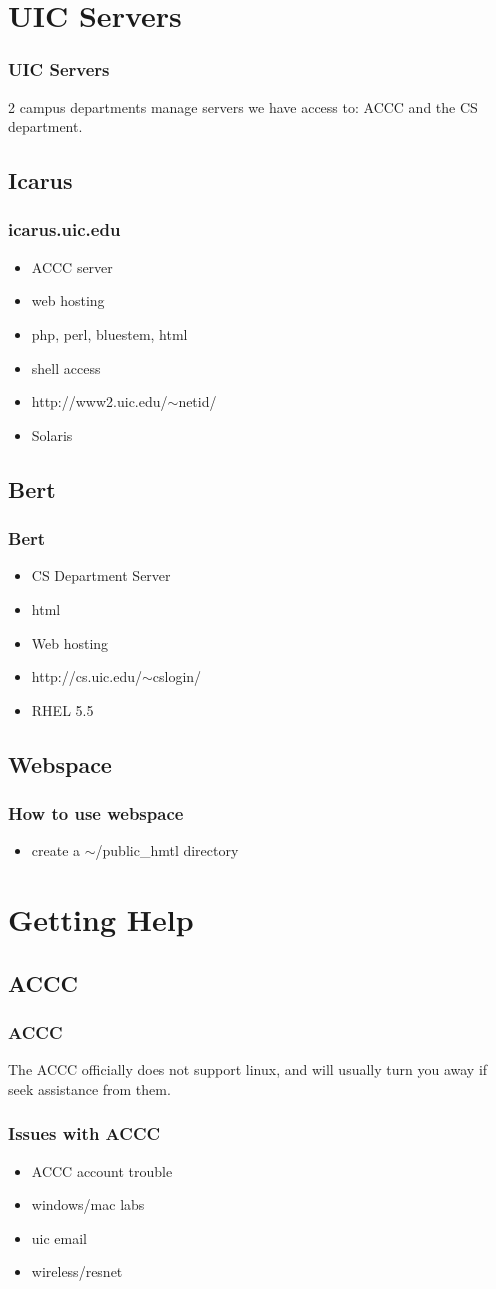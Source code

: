 \documentclass[hyperref={pdfpagelabels=false}]{beamer}
\begin{document}
\section{UIC Servers}
\frame
{
    \frametitle{UIC Servers}
    2 campus departments manage servers we have access to: ACCC and the CS department.
}
\subsection{Icarus}
\frame
{
    \frametitle{icarus.uic.edu}
    \begin{itemize}
    \item{ACCC server}
    \item{web hosting}
    \item{php, perl, bluestem, html}
    \item{shell access}
    \item{http://www2.uic.edu/$\sim$netid/}
    \item{Solaris}
    \end{itemize}
}
\subsection{Bert}
\frame
{
    \frametitle{Bert}
    \begin{itemize}
    \item{CS Department Server}
    \item{html}
    \item{Web hosting}
    \item{http://cs.uic.edu/$\sim$cslogin/}
    \item{RHEL 5.5}
    \end{itemize}
}
\subsection{Webspace}
\frame
{
    \frametitle{How to use webspace}
    \begin{itemize}
    \item{create a $\sim$/public\_hmtl directory}
    \end{itemize}
}
\section{Getting Help}

\subsection{ACCC}
\frame
{
	\frametitle{ACCC}
	The ACCC officially does not support linux, and will usually turn you away if
	seek assistance from them.
}
\frame
{
    \frametitle{Issues with ACCC}
    \begin{itemize}
    \item{ACCC account trouble}
    \item{windows/mac labs}
    \item{uic email}
    \item{wireless/resnet}
    \end{itemize}
}
\end{document}
